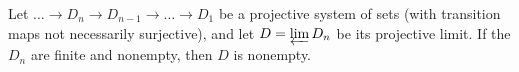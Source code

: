 Let $\ldots \rightarrow D_n \rightarrow D_{n-1} \rightarrow \ldots \rightarrow D_1$ be a projective system of sets (with transition maps not necessarily surjective), and let $D = \varprojlim D_n$ be its projective limit. If the $D_n$ are finite and nonempty, then $D$ is nonempty.
